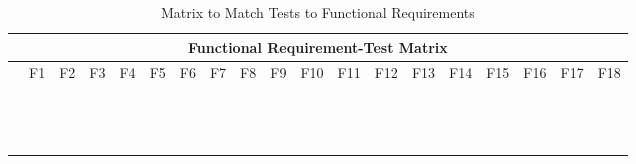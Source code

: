 \documentclass[11pt]{article}
\begin{document}
\begin{table}[H]
\centering
\caption{Matrix to Match Tests to Functional Requirements}
\label{my-label}
\begin{tabular}{| l | l | l | l | l | l | l | l | l | l | l | l | l | l | l | l | l | l | l |}
\hline
\multicolumn{19}{|c|}{\textbf{Functional Requirement-Test Matrix}}                          \\ \hline
 & \tiny{F1} & \tiny{F2} & \tiny{F3} & \tiny{F4} & \tiny{F5} & \tiny{F6} & \tiny{F7} & \tiny{F8} & \tiny{F9} & \tiny{F10} & \tiny{F11} & \tiny{F12} & \tiny{F13} & \tiny{F14} & \tiny{F15} & \tiny{F16} & \tiny{F17} & \tiny{F18} \\ \hline
           &             &           &  &  &  &  &  &  &  &  &  &  &  &  &  &  & &  \\ \hline
          &             &           &  &  &  &  &  &  &  &  &  &  &  &  &  &  & &  \\ \hline
          &             &           &  &  &  &  &  &  &  &  &  &  &  &  &  &  & &  \\ \hline
          &             &           &  &  &  &  &  &  &  &  &  &  &  &  &  &  & &  \\ \hline
          &             &           &  &  &  &  &  &  &  &  &  &  &  &  &  &  & &  \\ \hline
          &             &           &  &  &  &  &  &  &  &  &  &  &  &  &  &  & &  \\ \hline
          &             &           &  &  &  &  &  &  &  &  &  &  &  &  &  &  & &  \\ \hline
          &             &           &  &  &  &  &  &  &  &  &  &  &  &  &  &  & &  \\ \hline
          &             &           &  &  &  &  &  &  &  &  &  &  &  &  &  &  & &  \\ \hline
          &             &           &  &  &  &  &  &  &  &  &  &  &  &  &  &  & &  \\ \hline
          &             &           &  &  &  &  &  &  &  &  &  &  &  &  &  &  & &  \\ \hline
          &             &           &  &  &  &  &  &  &  &  &  &  &  &  &  &  & &  \\ \hline
          &             &           &  &  &  &  &  &  &  &  &  &  &  &  &  &  & &  \\ \hline
\end{tabular}
\end{table}
\end{document}
